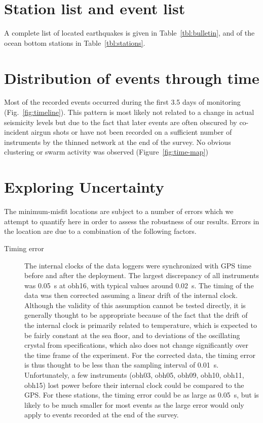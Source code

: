 \documentclass[jgr]{aguplus}
\newlength{\tw}
\begin{document}
\begin{article}
\appendix

\section{Station list and event list}

A complete list of located earthquakes is given in
Table~\ref{tbl:bulletin}, and of the ocean bottom stations in Table~\ref{tbl:stations}.

\section{Distribution of events through time}

Most of the recorded events occurred during the first 3.5 days of
monitoring (Fig.~\ref{fig:timeline}). This pattern is most likely not
related to a change in actual seismicity levels but due to the fact
that later events are often obscured by co-incident airgun shots or
have not been  recorded  on a sufficient number
of instruments by the thinned network at the end of the survey.   No
obvious clustering or swarm activity was observed (Figure~\ref{fig:time-map})

\section{Exploring Uncertainty}

The minimum-misfit locations are subject to a number of errors which
we attempt to quantify here in order to assess the robustness of our results.
   Errors in the location are due to a combination of
the following factors.
\begin{description}
\item[Timing error]  The internal clocks of the data loggers were
synchronized with GPS time before and after the deployment.  The
largest discrepancy of all instruments was 0.05~s at obh16, with
typical values around 0.02~s.  The
timing of the data was then corrected assuming a linear drift of the
internal clock. Although the validity of this assumption cannot be
tested directly, it is generally thought to be appropriate because of
the fact that the drift of the internal clock is primarily related to
temperature, which is expected to be fairly constant at
the sea floor, and to deviations of the oscillating crystal from
specifications, which also does not change significantly over the
time frame of the experiment. For the corrected data, the timing error
is thus thought to be less than the sampling interval of 0.01~s.
Unfortunately, a few instruments (obh03,
obh05, obh09, obh10, obh11, obh15) lost
power before their internal clock could be compared to the GPS.  For
these stations, the timing error could be as large as 0.05~s, but is
likely to be much smaller for most events as the large error would
only apply to events recorded at the end of the survey.


\end{description}
\end{article}
\end{document}
